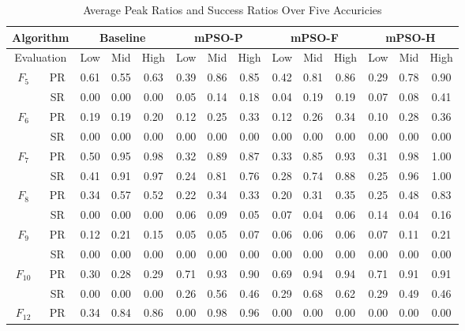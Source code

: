 \begin{table*}[h]
  \centering
  \caption{Average Peak Ratios and Success Ratios Over Five Accuricies}
  \begin{tabular}{|c|c|ccc|ccc|ccc|ccc|}
    \hline
    \multicolumn{2}{|c|}{Algorithm} & \multicolumn{3}{c|}{Baseline} & \multicolumn{3}{c|}{mPSO-P} & \multicolumn{3}{c|}{mPSO-F} & \multicolumn{3}{c|}{mPSO-H} \\
    \hline
    \multicolumn{2}{|c|}{Evaluation} & Low & Mid & High & Low & Mid & High & Low & Mid & High & Low & Mid & High \\
    \hline
    \multirow{2}{*}{$F_{5}$} & PR & 0.61 & 0.55 & 0.63 & 0.39 & 0.86 & 0.85 & 0.42 & 0.81 & 0.86 & 0.29 & 0.78 & 0.90 \\
    & SR & 0.00 & 0.00 & 0.00 & 0.05 & 0.14 & 0.18 & 0.04 & 0.19 & 0.19 & 0.07 & 0.08 & 0.41 \\
    \hline
    \multirow{2}{*}{$F_{6}$} & PR & 0.19 & 0.19 & 0.20 & 0.12 & 0.25 & 0.33 & 0.12 & 0.26 & 0.34 & 0.10 & 0.28 & 0.36 \\
    & SR & 0.00 & 0.00 & 0.00 & 0.00 & 0.00 & 0.00 & 0.00 & 0.00 & 0.00 & 0.00 & 0.00 & 0.00 \\
    \hline
    \multirow{2}{*}{$F_{7}$} & PR & 0.50 & 0.95 & 0.98 & 0.32 & 0.89 & 0.87 & 0.33 & 0.85 & 0.93 & 0.31 & 0.98 & 1.00 \\
    & SR & 0.41 & 0.91 & 0.97 & 0.24 & 0.81 & 0.76 & 0.28 & 0.74 & 0.88 & 0.25 & 0.96 & 1.00 \\
    \hline
    \multirow{2}{*}{$F_{8}$} & PR & 0.34 & 0.57 & 0.52 & 0.22 & 0.34 & 0.33 & 0.20 & 0.31 & 0.35 & 0.25 & 0.48 & 0.83 \\
    & SR & 0.00 & 0.00 & 0.00 & 0.06 & 0.09 & 0.05 & 0.07 & 0.04 & 0.06 & 0.14 & 0.04 & 0.16 \\
    \hline
    \multirow{2}{*}{$F_{9}$} & PR & 0.12 & 0.21 & 0.15 & 0.05 & 0.05 & 0.07 & 0.06 & 0.06 & 0.06 & 0.07 & 0.11 & 0.21 \\
    & SR & 0.00 & 0.00 & 0.00 & 0.00 & 0.00 & 0.00 & 0.00 & 0.00 & 0.00 & 0.00 & 0.00 & 0.00 \\
    \hline
    \multirow{2}{*}{$F_{10}$} & PR & 0.30 & 0.28 & 0.29 & 0.71 & 0.93 & 0.90 & 0.69 & 0.94 & 0.94 & 0.71 & 0.91 & 0.91 \\
    & SR & 0.00 & 0.00 & 0.00 & 0.26 & 0.56 & 0.46 & 0.29 & 0.68 & 0.62 & 0.29 & 0.49 & 0.46 \\
    \hline
    \multirow{2}{*}{$F_{12}$} & PR & 0.34 & 0.84 & 0.86 & 0.00 & 0.98 & 0.96 & 0.00 & 0.00 & 0.00 & 0.00 & 0.00 & 0.00 \\

\end{tabular}
\end{table*}
